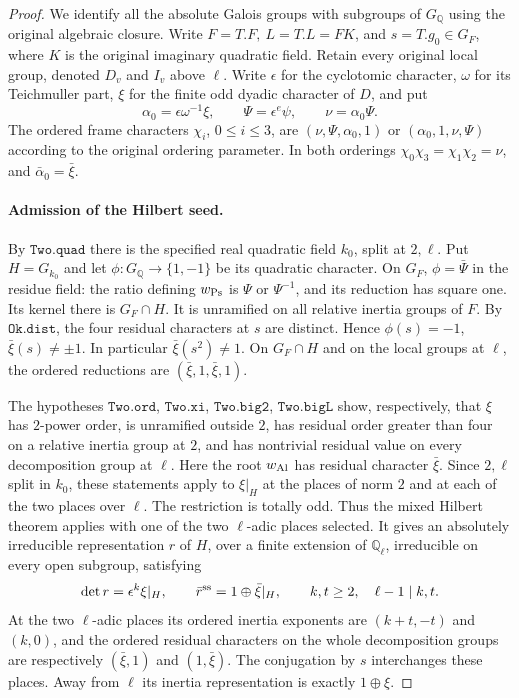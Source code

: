 \begin{proof}
We identify all the absolute Galois groups with subgroups of
\(G_{\mathbb Q}\) using the original algebraic closure. Write
\(F=T.F,\ L=T.L=FK\), and \(s=T.g_0\in G_F\), where \(K\) is
the original imaginary quadratic field. Retain every original local
group, denoted \(D_v\) and \(I_v\) above \(\ell\). Write
\(\epsilon\) for the cyclotomic character, \(\omega\) for its
Teichmuller part, \(\xi\) for the finite odd dyadic character of
\(D\), and put
\[
 \alpha_0=\epsilon\omega^{-1}\xi,\qquad
 \Psi=\epsilon^e\psi,\qquad \nu=\alpha_0\Psi.
\]
The ordered frame characters \(\chi_i\), \(0\le i\le3\), are
\((\nu,\Psi,\alpha_0,1)\) or \((\alpha_0,1,\nu,\Psi)\)
according to the original ordering parameter. In both orderings
\(\chi_0\chi_3=\chi_1\chi_2=\nu\), and
\(\bar\alpha_0=\bar\xi\).

\paragraph{Admission of the Hilbert seed.}
By \(\texttt{Two.quad}\) there is the specified real quadratic
field \(k_0\), split at \(2,\ell\). Put \(H=G_{k_0}\) and
let \(\phi:G_{\mathbb Q}\to\{1,-1\}\) be its quadratic character.
On \(G_F\), \(\phi=\bar\Psi\) in the residue field: the ratio
defining \(w_{\rm Ps}\) is \(\Psi\) or \(\Psi^{-1}\), and its
reduction has square one. Its kernel there is \(G_F\cap H\).
It is unramified on all relative inertia groups of \(F\).
By \(\texttt{Ok.dist}\), the four residual characters at \(s\)
are distinct. Hence \(\phi(s)=-1\), \(\bar\xi(s)\ne\pm1\).
In particular \(\bar\xi(s^2)\ne1\). On \(G_F\cap H\) and
on the local groups at \(\ell\), the ordered reductions are
\((\bar\xi,1,\bar\xi,1)\).

The hypotheses \(\texttt{Two.ord}\), \(\texttt{Two.xi}\),
\(\texttt{Two.big2}\), \(\texttt{Two.bigL}\) show, respectively,
that \(\xi\) has \(2\)-power order, is unramified outside \(2\),
has residual order greater than four on a relative inertia group
at \(2\), and has nontrivial residual value on every decomposition
group at \(\ell\). Here the root \(w_{\rm Al}\) has residual
character \(\bar\xi\). Since \(2,\ell\) split in \(k_0\), these
statements apply to \(\xi|_H\) at the places of norm \(2\) and
at each of the two places over \(\ell\). The restriction is totally
odd. Thus the mixed Hilbert theorem applies with one of the two
\(\ell\)-adic places selected. It gives an absolutely irreducible
representation \(r\) of \(H\), over a finite extension of
\(\mathbb Q_\ell\), irreducible on every open subgroup, satisfying
\[
 \det r=\epsilon^k\xi|_H,\qquad
 \bar r^{\rm ss}=1\oplus\bar\xi|_H,
 \qquad k,t\ge2,\quad \ell-1\mid k,t.
\]
At the two \(\ell\)-adic places its ordered inertia exponents are
\((k+t,-t)\) and \((k,0)\), and the ordered residual characters on
the whole decomposition groups are respectively
\((\bar\xi,1)\) and \((1,\bar\xi)\). The conjugation by \(s\)
interchanges these places. Away from \(\ell\) its inertia
representation is exactly \(1\oplus\xi\).


\end{proof}
